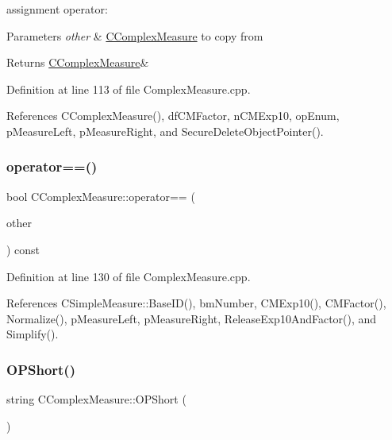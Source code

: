 assignment operator\+: 


\begin{DoxyParams}{Parameters}
{\em other} & \hyperlink{classCComplexMeasure}{C\+Complex\+Measure} to copy from \\
\hline
\end{DoxyParams}
\begin{DoxyReturn}{Returns}
\hyperlink{classCComplexMeasure}{C\+Complex\+Measure}\& 
\end{DoxyReturn}


Definition at line 113 of file Complex\+Measure.\+cpp.



References C\+Complex\+Measure(), df\+C\+M\+Factor, n\+C\+M\+Exp10, op\+Enum, p\+Measure\+Left, p\+Measure\+Right, and Secure\+Delete\+Object\+Pointer().

\mbox{\label{classCComplexMeasure_a30c168c8fbc0587835a11914f8af69e9}} 
\subsubsection{\texorpdfstring{operator==()}{operator==()}}
{\footnotesize\ttfamily bool C\+Complex\+Measure\+::operator== (\begin{DoxyParamCaption}\item[{const \hyperlink{classCComplexMeasure}{C\+Complex\+Measure} \&}]{other }\end{DoxyParamCaption}) const}



Definition at line 130 of file Complex\+Measure.\+cpp.



References C\+Simple\+Measure\+::\+Base\+I\+D(), bm\+Number, C\+M\+Exp10(), C\+M\+Factor(), Normalize(), p\+Measure\+Left, p\+Measure\+Right, Release\+Exp10\+And\+Factor(), and Simplify().

\mbox{\label{classCComplexMeasure_ab6a38e7259d7c27e735ff12fd711c5d5}} 
\subsubsection{\texorpdfstring{O\+P\+Short()}{OPShort()}}
{\footnotesize\ttfamily string C\+Complex\+Measure\+::\+O\+P\+Short (\begin{DoxyParamCaption}{ }\end{DoxyParamCaption})\hspace{0.3cm}{\ttfamily [inline]}}



